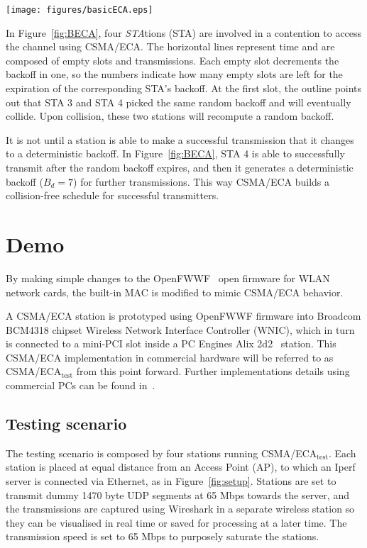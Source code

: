 \documentclass[conference]{IEEEtran}
\begin{document}
	\begin{figure*}[tb]
		\centering
		\texttt{[image: figures/basicECA.eps]}
		\caption{CSMA/ECA with four stations in saturation. ($B_{d}=7$.)}
		\label{fig:BECA}
	\end{figure*}

In Figure~\ref{fig:BECA}, four \emph{STA}tions (STA) are involved in a contention to access the channel using CSMA/ECA. The horizontal lines represent time and are composed of empty slots and transmissions. Each empty slot decrements the backoff in one, so the numbers indicate how many empty slots are left for the expiration of the corresponding STA's backoff. At the first slot, the outline points out that STA 3 and STA 4 picked the same random backoff and will eventually collide. Upon collision, these two stations will recompute a random backoff.

It is not until a station is able to make a successful transmission that it changes to a deterministic backoff. In Figure~\ref{fig:BECA}, STA 4 is able to successfully transmit after the random backoff expires, and then it generates a deterministic backoff ($B_{d}=7$) for further transmissions. This way CSMA/ECA builds a collision-free schedule for successful transmitters.

\section{Demo}\label{prototype}
By making simple changes to the OpenFWWF~\cite{OpenFWWF} open firmware for WLAN network cards, the built-in MAC is modified to mimic CSMA/ECA behavior.


A CSMA/ECA station is prototyped using OpenFWWF firmware into Broadcom BCM4318 chipset Wireless Network Interface Controller (WNIC), which in turn is connected to a mini-PCI slot inside a PC Engines Alix 2d2~\cite{Alix2d2} station. This CSMA/ECA implementation in commercial hardware will be referred to as CSMA/ECA$_{\text{test}}$ from this point forward. Further implementations details using commercial PCs can be found in~\cite{BECA-test}.

	\subsection{Testing scenario}
	The testing scenario is composed by four stations running CSMA/ECA$_{\text{test}}$. Each station is placed at equal distance from an Access Point (AP), to which an Iperf~\cite{tirumala2005iperf} server is connected via Ethernet, as in Figure~\ref{fig:setup}. Stations are set to transmit dummy 1470 byte UDP segments at 65 Mbps towards the server, and the transmissions are captured using Wireshark in a separate wireless station so they can be visualised in real time or saved for processing at a later time. The transmission speed is set to 65 Mbps to purposely saturate the stations.
	
\end{document}
